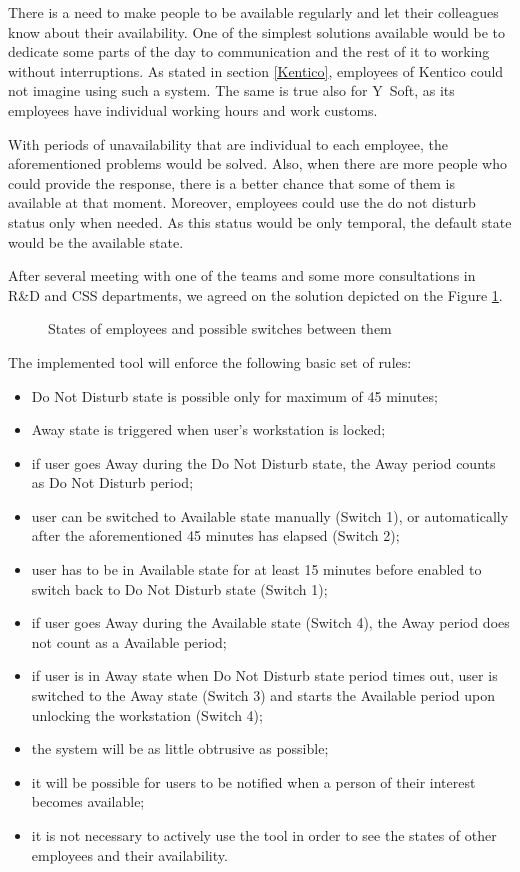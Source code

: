 \documentclass[11pt,singleside]{myfithesis2}
\newcommand{\pict}[4]{
	\begin{figure}[h!]
  		\vspace{-7px}
  		\centerline{\fcolorbox{darkgray}{palegray}{\texttt{[image: \#2]}}}
  		\caption{#1}
  		\label{#4}
	\end{figure}
}
\begin{document}
There is a need to make people to be available regularly and let their colleagues know about their availability. One of the simplest solutions available would be to dedicate some parts of the day to communication and the rest of it to working without interruptions. As stated in section \ref{Kentico}, employees of Kentico could not imagine using such a system. The same is true also for Y~Soft, as its employees have individual working hours and work customs. 

With periods of unavailability that are individual to each employee, the aforementioned problems would be solved. Also, when there are more people who could provide the response, there is a better chance that some of them is available at that moment. Moreover, employees could use the do not disturb status only when needed. As this status would be only temporal, the default state would be the available state.

After several meeting with one of the teams and some more consultations in R\&D and CSS departments, we agreed on the solution depicted on the Figure \ref{pic:states}.

\pict{States of employees and possible switches between them}{data/States.png}{width=0.8\textwidth}{pic:states}

The implemented tool will enforce the following basic set of rules:
\begin{itemize}
	\item Do Not Disturb state is possible only for maximum of 45 minutes;
	\item Away state is triggered when user's workstation is locked;
	\item if user goes Away during the Do Not Disturb state, the Away period counts as Do Not Disturb period;
	\item user can be switched to Available state manually (Switch 1), or automatically after the aforementioned 45 minutes has elapsed (Switch 2);
	\item user has to be in Available state for at least 15 minutes before enabled to switch back to Do Not Disturb state (Switch 1);
	\item if user goes Away during the Available state (Switch 4), the Away period does not count as a Available period;
	\item if user is in Away state when Do Not Disturb state period times out, user is switched to the Away state (Switch 3) and starts the Available period upon unlocking the workstation (Switch 4);
	\item the system will be as little obtrusive as possible;
	\item it will be possible for users to be notified when a person of their interest becomes available;
	\item it is not necessary to actively use the tool in order to see the states of other employees and their availability.
\end{itemize}
\end{document}
